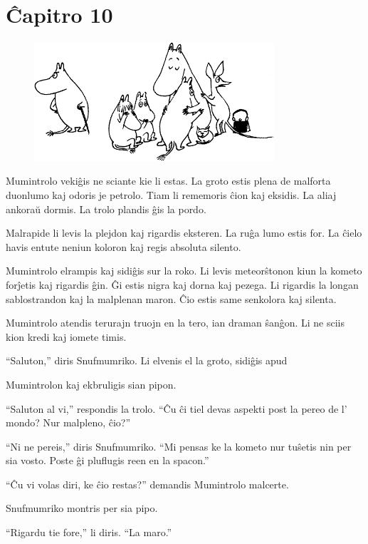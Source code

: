 \chapter*[Ĉapitro 10]{Ĉapitro 10}


\begin{figure}[htbp]
\centering
\includegraphics[width=253pt,height=125pt]{10-1.png}
\caption{}
\label{10-1}
\end{figure}

\noindent  Mumintrolo vekiĝis ne sciante kie li estas. La groto estis plena de malforta duonlumo kaj odoris je petrolo. Tiam li rememoris ĉion kaj eksidis. La aliaj ankoraŭ dormis. La trolo plandis ĝis la pordo.

Malrapide li levis la plejdon kaj rigardis eksteren. La ruĝa lumo estis for. La ĉielo havis entute neniun koloron kaj regis absoluta silento.

Mumintrolo elrampis kaj sidiĝis sur la roko. Li levis meteorŝtonon kiun la kometo forĵetis kaj rigardis ĝin. Ĝi estis nigra kaj dorna kaj pezega. Li rigardis la longan sablostrandon kaj la malplenan maron. Ĉio estis same senkolora kaj silenta.

Mumintrolo atendis terurajn truojn en la tero, ian draman ŝanĝon. Li ne sciis kion kredi kaj iomete timis.

``Saluton,'' diris Snufmumriko. Li elvenis el la groto, sidiĝis apud

Mumintrolon kaj ekbruligis sian pipon.

``Saluton al vi,'' respondis la trolo. ``Ĉu ĉi tiel devas aspekti post la pereo de l' mondo? Nur malpleno, ĉio?''

``Ni ne pereis,'' diris Snufmumriko. ``Mi pensas ke la kometo nur tuŝetis nin per sia vosto. Poste ĝi pluflugis reen en la spacon.''

``Ĉu vi volas diri, ke ĉio restas?'' demandis Mumintrolo malcerte.

Snufmumriko montris per sia pipo.

``Rigardu tie fore,'' li diris. ``La maro.''

